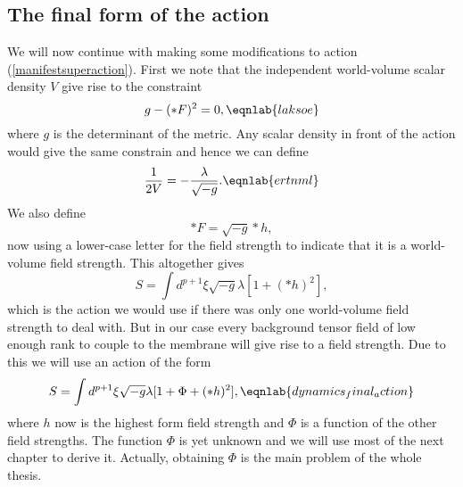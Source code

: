 \subsection{The final form of the action}
We will now continue with making some modifications to action (\ref{manifestsuperaction}). First we note that 
the independent world-volume scalar density $V$ give rise to the constraint
\begin{equation}
g-(*F)^2=0,
\eqnlab{laksoe}
\end{equation} 
where $g$ is the determinant of the metric. Any scalar density in front of the action would give the same constrain and hence we can define
\begin{equation}
{1 \over 2V}=-{\lambda \over \sqrt{-g}}.
\eqnlab{ertnml}
\end{equation}
We also define
\begin{equation}
*F = \sqrt{-g}*h,
\end{equation}
now using a lower-case letter for the field strength to indicate that it is a world-volume field strength. This altogether gives
\begin{equation}
S=\int d^{p+1} \xi \sqrt{-g} \lambda [1 + (*h)^2],
\end{equation}
which is the action we would use if there was only one world-volume field strength to deal with. But in our case 
every background tensor field of low enough rank to couple to the membrane will give rise to a field strength. 
Due to this we will use an action of the form
\begin{equation}
S=\int d^{p+1} \xi \sqrt{-g} \lambda [1 + \Phi + (*h)^2],
\eqnlab{dynamics_final_action}
\end{equation}
where $h$ now is the highest form field strength and $\Phi$ is a function of the other field strengths. The 
function $\Phi$ is yet unknown and we will use most of the next chapter to derive it. Actually, obtaining $\Phi$ 
is the main problem of the whole thesis.

